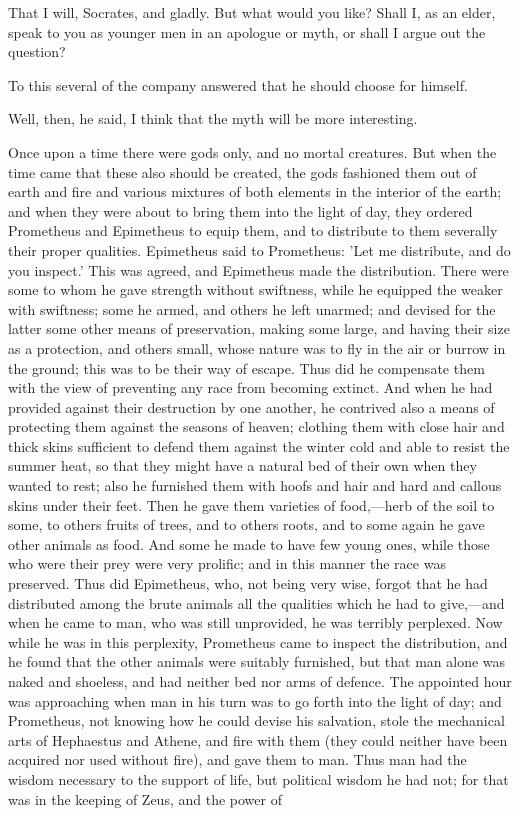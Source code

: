 \documentclass[11pt,letter]{article}
\begin{document}
\par  That I will, Socrates, and gladly. But what would you like? Shall I, as an elder, speak to you as younger men in an apologue or myth, or shall I argue out the question?

\par  To this several of the company answered that he should choose for himself.

\par  Well, then, he said, I think that the myth will be more interesting.

\par  Once upon a time there were gods only, and no mortal creatures. But when the time came that these also should be created, the gods fashioned them out of earth and fire and various mixtures of both elements in the interior of the earth; and when they were about to bring them into the light of day, they ordered Prometheus and Epimetheus to equip them, and to distribute to them severally their proper qualities. Epimetheus said to Prometheus: 'Let me distribute, and do you inspect.' This was agreed, and Epimetheus made the distribution. There were some to whom he gave strength without swiftness, while he equipped the weaker with swiftness; some he armed, and others he left unarmed; and devised for the latter some other means of preservation, making some large, and having their size as a protection, and others small, whose nature was to fly in the air or burrow in the ground; this was to be their way of escape. Thus did he compensate them with the view of preventing any race from becoming extinct. And when he had provided against their destruction by one another, he contrived also a means of protecting them against the seasons of heaven; clothing them with close hair and thick skins sufficient to defend them against the winter cold and able to resist the summer heat, so that they might have a natural bed of their own when they wanted to rest; also he furnished them with hoofs and hair and hard and callous skins under their feet. Then he gave them varieties of food,—herb of the soil to some, to others fruits of trees, and to others roots, and to some again he gave other animals as food. And some he made to have few young ones, while those who were their prey were very prolific; and in this manner the race was preserved. Thus did Epimetheus, who, not being very wise, forgot that he had distributed among the brute animals all the qualities which he had to give,—and when he came to man, who was still unprovided, he was terribly perplexed. Now while he was in this perplexity, Prometheus came to inspect the distribution, and he found that the other animals were suitably furnished, but that man alone was naked and shoeless, and had neither bed nor arms of defence. The appointed hour was approaching when man in his turn was to go forth into the light of day; and Prometheus, not knowing how he could devise his salvation, stole the mechanical arts of Hephaestus and Athene, and fire with them (they could neither have been acquired nor used without fire), and gave them to man. Thus man had the wisdom necessary to the support of life, but political wisdom he had not; for that was in the keeping of Zeus, and the power of 
\end{document}
